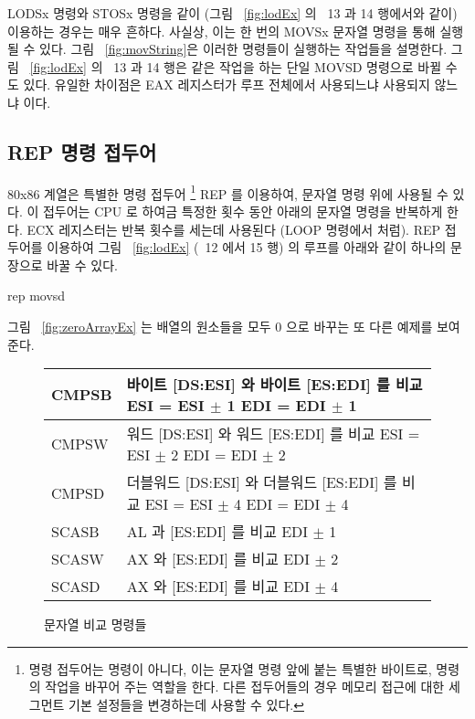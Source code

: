 {\code LODSx} 명령와 {\code STOSx} 명령을 같이 (그림 ~\ref{fig:lodEx}
의 ~13 과 14 행에서와 같이) 이용하는 경우는 매우 흔하다. 사실상, 이는 
한 번의 {\code MOVSx} 문자열 명령을 통해 실행될 수 있다. 그림 ~\ref{fig:movString}은
이러한 명령들이 실행하는 작업들을 설명한다. 그림 ~\ref{fig:lodEx} 의 ~13 과 14 행은
같은 작업을 하는 단일 {\code MOVSD} 명령으로 바뀔 수 도 있다. 유일한 차이점은
EAX 레지스터가 루프 전체에서 사용되느냐 사용되지 않느냐 이다. 

\subsection{{\protect\code REP} 명령 접두어}

80x86 계열은 특별한 명령 접두어 
\footnote{명령 접두어는 명령이 아니다, 이는 문자열 명령 앞에 붙는
특별한 바이트로, 명령의 작업을 바꾸어 주는 역할을 한다. 다른 접두어들의
경우 메모리 접근에 대한 세그먼트 기본 설정들을 변경하는데 사용할 수 있다. }
{\code REP} 를 이용하여, 문자열 명령 위에 사용될 수 있다. 이 접두어는 CPU 로 하여금
특정한 횟수 동안 아래의 문자열 명령을 반복하게 한다. ECX 레지스터는 반복 횟수를
세는데 사용된다 ({\code LOOP} 명령에서 처럼). {\code REP} 접두어를 이용하여 그림
~\ref{fig:lodEx} (~12 에서 15 행) 의 루프를 아래와 같이 하나의 문장으로 바꿀 수 있다.

\begin{AsmCodeListing}[frame=none, numbers=none]
      rep movsd
\end{AsmCodeListing}

그림 ~\ref{fig:zeroArrayEx} 는 배열의 원소들을 모두 0 으로 바꾸는 또 다른 예제를 보여준다.


\begin{figure}[t]
\centering
{\code
\begin{tabular}{|lp{3.5in}|}
\hline
CMPSB & 바이트 [DS:ESI] 와 바이트 [ES:EDI] 를 비교 \newline ESI = ESI $\pm$ 1 
        \newline EDI = EDI $\pm$ 1 \\
\hline
CMPSW & 워드 [DS:ESI] 와 워드 [ES:EDI] 를 비교 \newline ESI = ESI $\pm$ 2 
        \newline EDI = EDI $\pm$ 2 \\
\hline
CMPSD & 더블워드 [DS:ESI] 와 더블워드 [ES:EDI] 를 비교 \newline ESI = ESI $\pm$ 4 
        \newline EDI = EDI $\pm$ 4 \\
\hline
SCASB & AL 과 [ES:EDI] 를 비교 \newline EDI $\pm$ 1 \\
\hline
SCASW & AX 와 [ES:EDI] 를 비교 \newline EDI $\pm$ 2 \\
\hline
SCASD & AX 와 [ES:EDI] 를 비교 \newline EDI $\pm$ 4 \\
\hline
\end{tabular}
}
\caption{문자열 비교 명령들\label{fig:cmpString}
            
          }
\end{figure}

